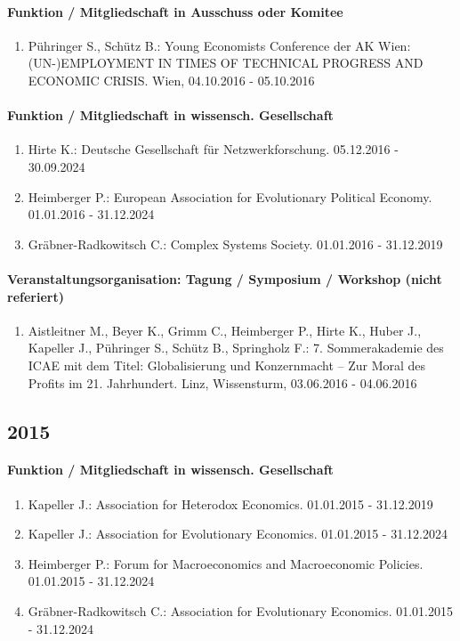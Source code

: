 \paragraph{Funktion / Mitgliedschaft in Ausschuss oder Komitee} 
\begin{enumerate}[leftmargin=*, labelsep=0.5cm] 
 	 \item Pühringer S., Schütz B.: Young Economists Conference der AK Wien: (UN-)EMPLOYMENT IN TIMES OF TECHNICAL PROGRESS AND ECONOMIC CRISIS. Wien, 04.10.2016 - 05.10.2016 
\end{enumerate} 
\paragraph{Funktion / Mitgliedschaft in wissensch. Gesellschaft} 
\begin{enumerate}[leftmargin=*, labelsep=0.5cm] 
 	 \item Hirte K.: Deutsche Gesellschaft für Netzwerkforschung. 05.12.2016 - 30.09.2024 
	 \item Heimberger P.: European Association for Evolutionary Political Economy. 01.01.2016 - 31.12.2024 
	 \item Gräbner-Radkowitsch C.: Complex Systems Society. 01.01.2016 - 31.12.2019 
\end{enumerate} 
\paragraph{Veranstaltungsorganisation: Tagung / Symposium / Workshop (nicht referiert)} 
\begin{enumerate}[leftmargin=*, labelsep=0.5cm] 
 	 \item Aistleitner M., Beyer K., Grimm C., Heimberger P., Hirte K., Huber J., Kapeller J., Pühringer S., Schütz B., Springholz F.: 7. Sommerakademie des ICAE mit dem Titel: Globalisierung und Konzernmacht – Zur Moral des Profits im 21. Jahrhundert. Linz, Wissensturm, 03.06.2016 - 04.06.2016 
\end{enumerate} 
\subsection*{2015} 
\paragraph{Funktion / Mitgliedschaft in wissensch. Gesellschaft} 
\begin{enumerate}[leftmargin=*, labelsep=0.5cm] 
 	 \item Kapeller J.: Association for Heterodox Economics. 01.01.2015 - 31.12.2019 
	 \item Kapeller J.: Association for Evolutionary Economics. 01.01.2015 - 31.12.2024 
	 \item Heimberger P.: Forum for Macroeconomics and Macroeconomic Policies. 01.01.2015 - 31.12.2024 
	 \item Gräbner-Radkowitsch C.: Association for Evolutionary Economics. 01.01.2015 - 31.12.2024 
\end{enumerate} 
